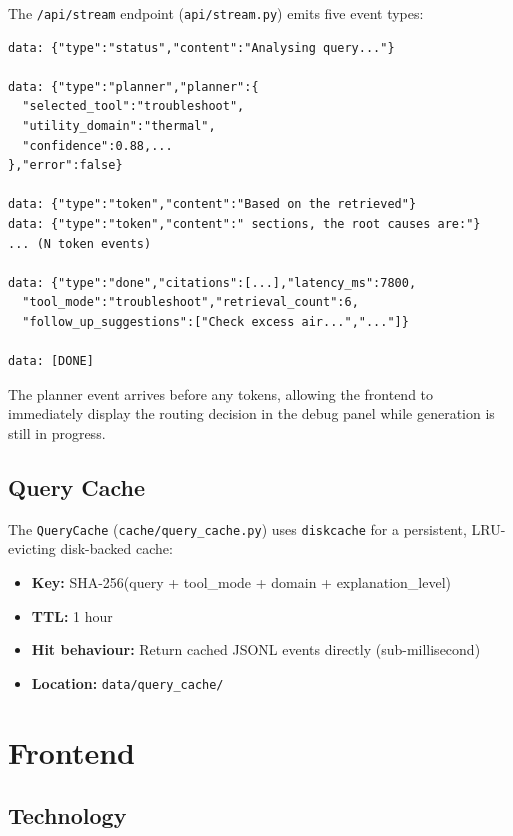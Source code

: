 \documentclass[12pt,a4paper]{report}
\begin{document}
The \texttt{/api/stream} endpoint (\texttt{api/stream.py}) emits five event types:

\begin{lstlisting}[caption={SSE event sequence}]
data: {"type":"status","content":"Analysing query..."}

data: {"type":"planner","planner":{
  "selected_tool":"troubleshoot",
  "utility_domain":"thermal",
  "confidence":0.88,...
},"error":false}

data: {"type":"token","content":"Based on the retrieved"}
data: {"type":"token","content":" sections, the root causes are:"}
... (N token events)

data: {"type":"done","citations":[...],"latency_ms":7800,
  "tool_mode":"troubleshoot","retrieval_count":6,
  "follow_up_suggestions":["Check excess air...","..."]}

data: [DONE]
\end{lstlisting}

The planner event arrives before any tokens, allowing the frontend to immediately display the routing decision in the debug panel while generation is still in progress.

\section{Query Cache}

The \texttt{QueryCache} (\texttt{cache/query\_cache.py}) uses \texttt{diskcache} for a persistent, LRU-evicting disk-backed cache:

\begin{itemize}
  \item \textbf{Key:} SHA-256(query + tool\_mode + domain + explanation\_level)
  \item \textbf{TTL:} 1 hour
  \item \textbf{Hit behaviour:} Return cached JSONL events directly (sub-millisecond)
  \item \textbf{Location:} \texttt{data/query\_cache/}
\end{itemize}

\chapter{Frontend}

\section{Technology}
\end{document}
